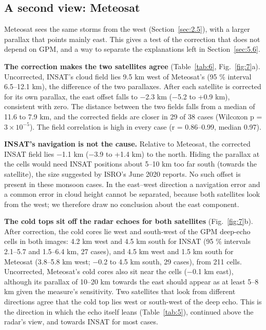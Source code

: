\subsection{A second view: Meteosat}\label{sec:5.7}

Meteosat sees the same storms from the west (Section~\ref{sec:2.5}), with a larger parallax that points mainly east. This gives a test of the correction that does not depend on GPM, and a way to separate the explanations left in Section~\ref{sec:5.6}.

\textbf{The correction makes the two satellites agree} (Table~\ref{tab:6}, Fig.~\ref{fig:7}a). Uncorrected, INSAT's cloud field lies 9.5 km west of Meteosat's (95 \% interval 6.5--12.1 km), the difference of the two parallaxes. After each satellite is corrected for its own parallax, the east offset falls to −2.3 km (−5.2 to +0.9 km), consistent with zero. The distance between the two fields falls from a median of 11.6 to 7.9 km, and the corrected fields are closer in 29 of 38 cases (Wilcoxon p = \(3 \times 10^{-5}\)). The field correlation is high in every case (r = 0.86--0.99, median 0.97).

\textbf{INSAT's navigation is not the cause.} Relative to Meteosat, the corrected INSAT field lies −1.1 km (−3.9 to +1.4 km) to the north. Hiding the parallax at the cells would need INSAT positions about 5--10 km too far south (towards the satellite), the size suggested by ISRO's June 2020 reports. No such offset is present in these monsoon cases. In the east--west direction a navigation error and a common error in cloud height cannot be separated, because both satellites look from the west; we therefore draw no conclusion about the east component.

\textbf{The cold tops sit off the radar echoes for both satellites} (Fig.~\ref{fig:7}b). After correction, the cold cores lie west and south-west of the GPM deep-echo cells in both images: 4.2 km west and 4.5 km south for INSAT (95 \% intervals 2.1--5.7 and 1.5--6.4 km, 27 cases), and 4.5 km west and 1.5 km south for Meteosat (3.8--5.8 km west; −0.2 to 4.5 km south, 29 cases), from 211 cells. Uncorrected, Meteosat's cold cores also sit near the cells (−0.1 km east), although its parallax of 10--20 km towards the east should appear as at least 5--8 km given the measure's sensitivity. Two satellites that look from different directions agree that the cold top lies west or south-west of the deep echo. This is the direction in which the echo itself leans (Table~\ref{tab:5}), continued above the radar's view, and towards INSAT for most cases.

